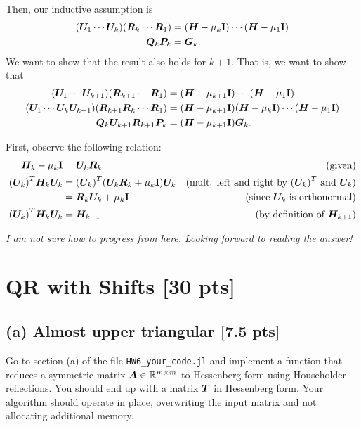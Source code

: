 \documentclass[twoside,10pt]{article}
\begin{document}
Then, our inductive assumption is
\begin{align*}
  \left(\mtx{U}_1 \cdots \mtx{U}_k\right)\left(\mtx{R}_k \cdots \mtx{R}_1\right) &= \left(\mtx{H} - \mu_k \Id\right) \cdots \left(\mtx{H} - \mu_1 \Id\right)\\
  \mtx{Q}_k\mtx{P}_k &= \mtx{G}_k.
\end{align*}
We want to show that the result also holds for $k+1$.
That is, we want to show that
\begin{align*}
  \left(\mtx{U}_1 \cdots \mtx{U}_{k+1}\right)\left(\mtx{R}_{k+1} \cdots \mtx{R}_1\right) &= \left(\mtx{H} - \mu_{k+1} \Id\right) \cdots \left(\mtx{H} - \mu_1 \Id\right)\\
  \left(\mtx{U}_1 \cdots \mtx{U}_{k} \mtx{U}_{k+1}\right)\left(\mtx{R}_{k+1} \mtx{R}_{k} \cdots \mtx{R}_1\right) &=  \left(\mtx{H} - \mu_{k+1} \Id\right) \left(\mtx{H} - \mu_k \Id\right) \cdots \left(\mtx{H} - \mu_1 \Id\right)\\
  \mtx{Q}_k \mtx{U}_{k+1}\mtx{R}_{k+1} \mtx{P}_k &= \left(\mtx{H} - \mu_{k+1} \Id\right) \mtx{G}_k.
\end{align*}

First, observe the following relation:
\begin{align*}
  \mtx{H}_k - \mu_k \Id &= \mtx{U}_k \mtx{R}_k&\text{(given)}\\
  \left(\mtx{U}_k\right)^T \mtx{H}_k \mtx{U}_k &=\left(\mtx{U}_k\right)^T \left(\mtx{U}_k \mtx{R}_k + \mu_k \Id\right) \mtx{U}_k&\text{(mult. left and right by $\left(\mtx{U}_k\right)^T$ and $\mtx{U}_k$)}\\
  &= \mtx{R}_k \mtx{U}_k + \mu_k \Id&\text{(since $\mtx{U}_k$ is orthonormal)}\\
  \left(\mtx{U}_k\right)^T \mtx{H}_k \mtx{U}_k &= \mtx{H}_{k+1}&\text{(by definition of $\mtx{H}_{k+1}$)}
\end{align*}

\textit{I am not sure how to progress from here. Looking forward to reading the answer!}

\section{QR with Shifts [30 pts]}
\subsection*{(a) Almost upper triangular [7.5 pts]} 
Go to section (a) of the file \texttt{HW6\_your\_code.jl} and implement a function that reduces a symmetric matrix $\bm{A} \in \mathbb{R}^{m\times m}$ to Hessenberg form using Householder reflections. You should end up with a matrix $\bm{T}$ in Hessenberg form. Your algorithm should operate in place, overwriting the input matrix and not allocating additional memory. 
\end{document}

